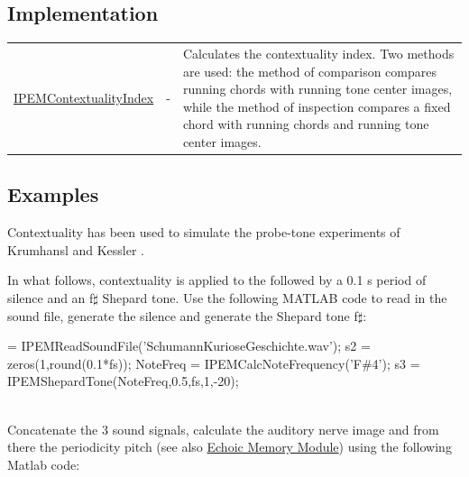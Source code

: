 \subsection{Implementation}

\begin{tabularx}{\linewidth}{llX}
\hyperlink{FuncRef:IPEMContextualityIndex}{IPEMContextualityIndex}
& - & Calculates the contextuality index. Two methods are used:
the method of comparison compares running chords with running tone
center images, while the method of inspection compares a fixed
chord with running chords and running tone center images.
\end{tabularx}


\subsection{Examples}

Contextuality has been used to simulate the probe-tone experiments
of Krumhansl and Kessler
\cite{article:MusicPerception:Leman:2000,KrumhanslKessler:82}.

In what follows, contextuality is applied to the
 followed by a 0.1 s period of
silence and an f$\sharp$ Shepard tone. Use the following MATLAB
code to read in the sound file, generate the silence and generate
the Shepard tone f$\sharp$:\\

\begin{IPEMCodeEnvironment}
[s1,fs] = IPEMReadSoundFile('SchumannKurioseGeschichte.wav');
\newline s2 = zeros(1,round(0.1*fs));
\newline NoteFreq = IPEMCalcNoteFrequency('F\#4');
\newline s3 = IPEMShepardTone(NoteFreq,0.5,fs,1,-20);
\end{IPEMCodeEnvironment}\\

Concatenate the 3 sound signals, calculate the auditory nerve
image and from there the periodicity pitch (see also
\hyperlink{Concepts:EchoicMemoryModule}{Echoic Memory Module})
using the following Matlab code:\\


